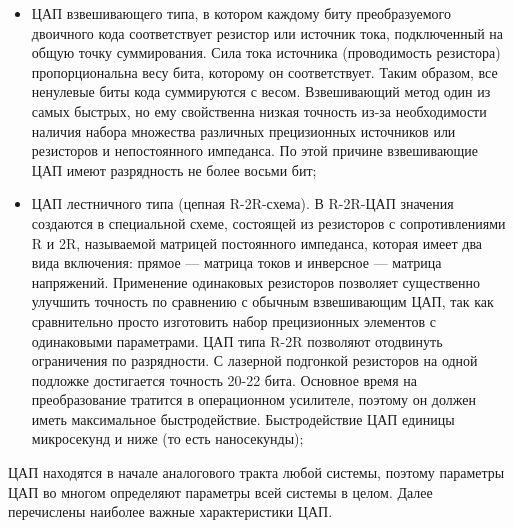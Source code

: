 \documentclass[unicode, 12pt, a4paper, oneside]{article}
\begin{document}
\begin{itemize}
\item ЦАП взвешивающего типа, в котором каждому биту преобразуемого двоичного кода соответствует резистор или источник тока, подключенный на общую точку суммирования. Сила тока источника (проводимость резистора) пропорциональна весу бита, которому он соответствует. Таким образом, все ненулевые биты кода суммируются с весом. Взвешивающий метод один из самых быстрых, но ему свойственна низкая точность из-за необходимости наличия набора множества различных прецизионных источников или резисторов и непостоянного импеданса. По этой причине взвешивающие ЦАП имеют разрядность не более восьми бит;

\item ЦАП лестничного типа (цепная R-2R-схема). В R-2R-ЦАП значения создаются в специальной схеме, состоящей из резисторов с сопротивлениями R и 2R, называемой матрицей постоянного импеданса, которая имеет два вида включения: прямое — матрица токов и инверсное — матрица напряжений. Применение одинаковых резисторов позволяет существенно улучшить точность по сравнению с обычным взвешивающим ЦАП, так как сравнительно просто изготовить набор прецизионных элементов с одинаковыми параметрами. ЦАП типа R-2R позволяют отодвинуть ограничения по разрядности. С лазерной подгонкой резисторов на одной подложке достигается точность 20-22 бита. Основное время на преобразование тратится в операционном усилителе, поэтому он должен иметь максимальное быстродействие. Быстродействие ЦАП единицы микросекунд и ниже (то есть наносекунды);
\end{itemize}

ЦАП находятся в начале аналогового тракта любой системы, поэтому параметры ЦАП во многом определяют параметры всей системы в целом. Далее перечислены наиболее важные характеристики ЦАП.
\end{document}
